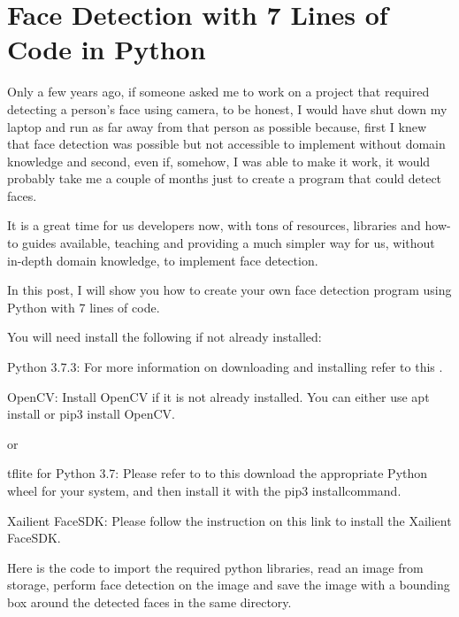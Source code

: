 

\chapter{Face Detection with 7 Lines of Code in Python}

Only a few years ago, if someone asked me to work on a project that required detecting a person’s face using camera, to be honest, I would have shut down my laptop and run as far away from that person as possible because, first I knew that face detection was possible but not accessible to implement without domain knowledge and second, even if, somehow, I was able to make it work, it would probably take me a couple of months just to create a program that could detect faces.

It is a great time for us developers now, with tons of resources, libraries and how-to guides available, teaching and providing a much simpler way for us, without in-depth domain knowledge, to implement face detection.

In this post, I will show you how to create your own face detection program using Python with 7 lines of code.

You will need install the following if not already installed:

Python 3.7.3: For more information on downloading and installing refer to this .

OpenCV: Install OpenCV if it is not already installed. You can either use apt install or pip3 install OpenCV.

\medskip


\medskip

or

\medskip


\medskip

tflite for Python 3.7: Please refer to  to this download the appropriate Python wheel for your system, and then install it with the pip3 installcommand.

Xailient FaceSDK: Please follow the instruction on this link to install the Xailient FaceSDK.


Here is the code to import the required python libraries, read an image from storage, perform face detection on the image and save the image with a bounding box around the detected faces in the same directory.

